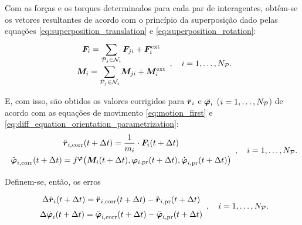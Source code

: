Com as forças e os torques determinados para cada par de interagentes, obtêm-se os vetores resultantes de acordo com o princípio da superposição dado pelas equações \eqref{eq:superposition_translation} e \eqref{eq:superposition_rotation}:
\begin{equation*}
	\def\arraystretch{1.5}
	\begin{array}{c}
		\resultingForcei = \dsum_{\particlej\in\ineighborhood{i}}\forceji + \external\forcei\\
		\resultingTorquei = \dsum_{\particlej\in\ineighborhood{i}}\torqueji + \external\torquei
	\end{array}, \quad i = 1, \dots, \numberOfParticles.
\end{equation*}

E, com isso, são obtidos os valores corrigidos para \(\accelerationi\) e \(\deriv{2}{\orientationi}\) (\(i=1,\dots,N_{\mathcal{P}}\)) de acordo com as equações de movimento \eqref{eq:motion_first} e \eqref{eq:diff_equation_orientation_parametrization}:
\begin{equation*}
	\def\arraystretch{1.5}
	\begin{array}{c}
		\accelerationicorr\pqty{t+\Dt} = \dfrac{1}{\massi}\cdot\resultingForcei\pqty{t+\Dt} \\
		\dorientationicorr{2}\pqty{t+\Dt} = \eqFor{\orientation}\pqty{\resultingTorquei\pqty{t+\Dt}, \orientationipr\pqty{t+\Dt}, \dorientationipr{1}\pqty{t+\Dt}}
	\end{array}, \quad i = 1, \dots, \numberOfParticles.
\end{equation*}

Definem-se, então, os erros
\begin{equation*}
	\def\arraystretch{1.5}
	\begin{array}{c}
		\Delta \accelerationi\pqty{t+\Dt} = \accelerationicorr\pqty{t+\Dt} - \accelerationipr\pqty{t+\Dt} \\
		\Delta \dorientationi{2}\pqty{t+\Dt} = \dorientationicorr{2}\pqty{t+\Dt} - \dorientationipr{2}\pqty{t+\Dt} \\
	\end{array}, \quad i = 1, \dots, \numberOfParticles.
\end{equation*}

